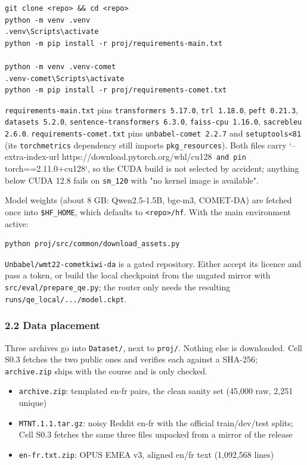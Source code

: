 \documentclass[a4paper,12pt,oneside]{article}
\begin{document}
\begin{Verbatim}[fontsize=\footnotesize,breaklines=true,breakanywhere=true]
git clone <repo> && cd <repo>
python -m venv .venv
.venv\Scripts\activate
python -m pip install -r proj/requirements-main.txt

python -m venv .venv-comet
.venv-comet\Scripts\activate
python -m pip install -r proj/requirements-comet.txt
\end{Verbatim}

\texttt{requirements-main.txt} pins \texttt{transformers 5.17.0}, \texttt{trl 1.18.0}, \texttt{peft 0.21.3},
\texttt{datasets 5.2.0}, \texttt{sentence-transformers 6.3.0}, \texttt{faiss-cpu 1.16.0}, \texttt{sacrebleu 2.6.0}.
\texttt{requirements-comet.txt} pins \texttt{unbabel-comet 2.2.7} and \texttt{setuptools<81} (its \texttt{torchmetrics}
dependency still imports \texttt{pkg\_resources}). Both files carry `--extra-index-url
https://download.pytorch.org/whl/cu128\texttt{ and pin }torch==2.11.0+cu128`, so the CUDA build is not
selected by accident; anything below CUDA 12.8 fails on \texttt{sm\_120} with "no kernel image is
available".

Model weights (about 8 GB: Qwen2.5-1.5B, bge-m3, COMET-DA) are fetched once into \texttt{\$HF\_HOME},
which defaults to \texttt{<repo>/hf}. With the main environment active:

\begin{Verbatim}[fontsize=\footnotesize,breaklines=true,breakanywhere=true]
python proj/src/common/download_assets.py
\end{Verbatim}

\texttt{Unbabel/wmt22-cometkiwi-da} is a gated repository. Either accept its licence and pass a token,
or build the local checkpoint from the ungated mirror with \texttt{src/eval/prepare\_qe.py}; the router
only needs the resulting \texttt{runs/qe\_local/.../model.ckpt}.

\subsubsection*{2.2 Data placement}

Three archives go into \texttt{Dataset/}, next to \texttt{proj/}. Nothing else is downloaded. Cell S0.3 fetches
the two public ones and verifies each against a SHA-256; \texttt{archive.zip} ships with the course and
is only checked.

\begin{itemize}\setlength{\itemsep}{2pt}
  \item \texttt{archive.zip}: templated en-fr pairs, the clean sanity set (45,000 raw, 2,251 unique)
  \item \texttt{MTNT.1.1.tar.gz}: noisy Reddit en-fr with the official train/dev/test splits; Cell S0.3 fetches the same three files unpacked from a mirror of the release
  \item \texttt{en-fr.txt.zip}: OPUS EMEA v3, aligned en/fr text (1,092,568 lines)
\end{itemize}
\end{document}
